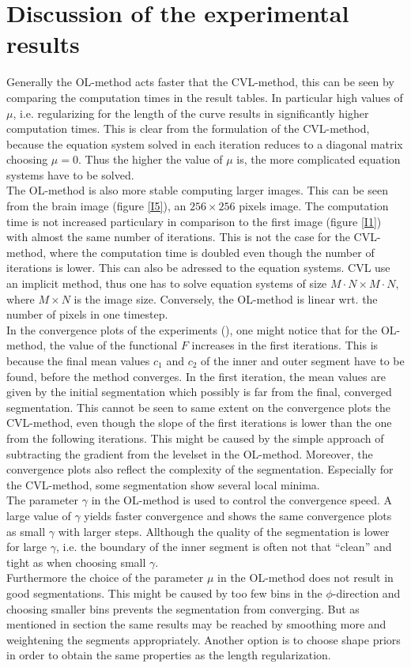\section{Discussion of the experimental results}
Generally the OL-method acts faster that the CVL-method, this can be seen by comparing the computation times in the result tables. In particular high values of $\mu$, i.e. regularizing for the length of the curve results in significantly higher computation times. This is clear from the formulation of the CVL-method, because the equation system solved in each iteration reduces to a diagonal matrix choosing $\mu=0$. Thus the higher the value of $\mu$ is, the more complicated equation systems have to be solved.\\
The OL-method is also more stable computing larger images. This can be seen from the brain image (figure \ref{I5}), an $256\times 256$ pixels image. The computation time is not increased particulary in comparison to the first image (figure \ref{I1}) with almost the same number of iterations. This is not the case for the CVL-method, where the computation time is doubled even though the number of iterations is lower. This can also be adressed to the equation systems. CVL use an implicit method, thus one has to solve equation systems of size $M\cdot N\times M\cdot N$, where $M\times N$ is the image size. Conversely, the OL-method is linear wrt. the number of pixels in one timestep.\\
In the convergence plots of the experiments (), one might notice that for the OL-method, the value of the functional $F$ increases in the first iterations. This is because the final mean values $c_1$ and $c_2$ of the inner and outer segment have to be found, before the method converges. In the first iteration, the mean values are given by the initial segmentation which possibly is far from the final, converged segmentation. This cannot be seen to same extent on the convergence plots the CVL-method, even though the slope of the first iterations is lower than the one from the following iterations. This might be caused by the simple approach of subtracting the gradient from the levelset in the OL-method. Moreover, the convergence plots also reflect the complexity of the segmentation. Especially for the CVL-method, some segmentation show several local minima.\\
The parameter $\gamma$ in the OL-method is used to control the convergence speed. A large value of $\gamma$ yields faster convergence and shows the same convergence plots as small $\gamma$ with larger steps. Allthough the quality of the segmentation is lower for large $\gamma$, i.e. the boundary of the inner segment is often not that ``clean'' and tight as when choosing small $\gamma$.\\ 
Furthermore the choice of the parameter $\mu$ in the OL-method does not result in good segmentations. This might be caused by too few bins in the $\phi$-direction and choosing smaller bins prevents the segmentation from converging. But as mentioned in section  the same results may be reached by smoothing more and weightening the segments appropriately. Another option is to choose shape priors in order to obtain the same properties as the length regularization.

